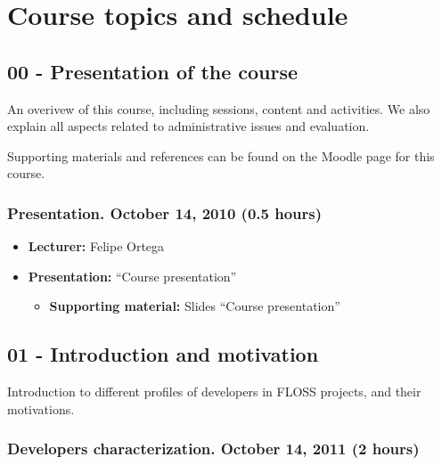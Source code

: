 \documentclass[a4paper]{article}
\begin{document}
\section{Course topics and schedule}

\subsection{00 - Presentation of the course}

An overivew of this course, including sessions, content and activities. We also explain all aspects related to administrative issues and evaluation.

Supporting materials and references can be found on the Moodle page for this course.

\subsubsection{Presentation. October 14, 2010 (0.5 hours)}

\begin{itemize}
\item \textbf{Lecturer:} Felipe Ortega
\item \textbf{Presentation:} ``Course presentation''
  \begin{itemize}
  \item \textbf{Supporting material:} Slides ``Course presentation''
  \end{itemize}
\end{itemize}

\subsection{01 - Introduction and motivation}

Introduction to different profiles of developers in FLOSS projects, and their motivations.

\subsubsection{Developers characterization. October 14, 2011 (2 hours)}
\end{document}
